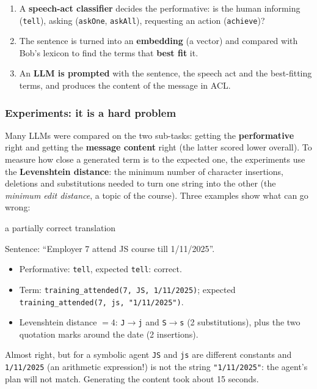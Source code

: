 \begin{enumerate}[nosep]
  \item A \textbf{speech-act classifier} decides the performative: is the human
        informing (\texttt{tell}), asking (\texttt{askOne}, \texttt{askAll}),
        requesting an action (\texttt{achieve})?
  \item The sentence is turned into an \textbf{embedding} (a vector) and compared with
        Bob's lexicon to find the terms that \textbf{best fit} it.
  \item An \textbf{LLM is prompted} with the sentence, the speech act and the
        best-fitting terms, and produces the content of the message in ACL.
\end{enumerate}

\subsubsection{Experiments: it is a hard problem}

Many LLMs were compared on the two sub-tasks: getting the \textbf{performative} right and
getting the \textbf{message content} right (the latter scored lower overall). To measure
how close a generated term is to the expected one, the experiments use the
\textbf{Levenshtein distance}: the minimum number of character insertions, deletions and
substitutions needed to turn one string into the other (the \emph{minimum edit
distance}, a topic of the course). Three examples show what can go wrong:

\begin{nbexample}{a partially correct translation}
\raggedright
Sentence: ``Employer 7 attend JS course till 1/11/2025''.
\begin{itemize}[nosep]
  \item Performative: \texttt{tell}, expected \texttt{tell}: correct.
  \item Term: \texttt{training\_attended(7, JS, 1/11/2025)}; expected
        \texttt{training\_attended(7, js, "1/11/2025")}.
  \item Levenshtein distance $=4$: \texttt{J}$\to$\texttt{j} and
        \texttt{S}$\to$\texttt{s} (2 substitutions), plus the two quotation marks
        around the date (2 insertions).
\end{itemize}
Almost right, but for a symbolic agent \texttt{JS} and \texttt{js} are different
constants and \texttt{1/11/2025} (an arithmetic expression!) is not the string
\texttt{"1/11/2025"}: the agent's plan will not match. Generating the content took about
15 seconds.
\end{nbexample}

